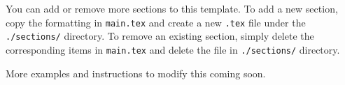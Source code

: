 You can add or remove more sections to this template. To add a new section, copy the formatting in \texttt{main.tex} and create a new \texttt{.tex} file under the \texttt{./sections/} directory. To remove an existing section, simply delete the corresponding items in \texttt{main.tex} and delete the file in \texttt{./sections/} directory.

More examples and instructions to modify this coming soon.

\blindtext